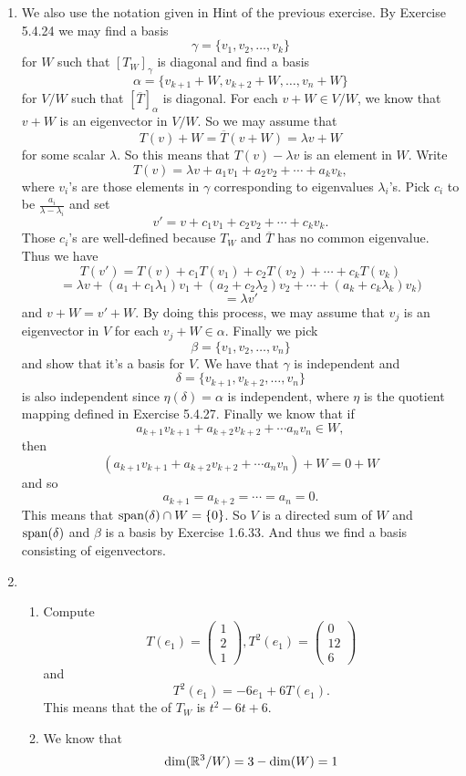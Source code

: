 \begin{enumerate}
\item We also use the notation given in Hint of the previous exercise. By Exercise 5.4.24 we may find a basis 
\[\gamma=\{v_1,v_2,\ldots ,v_k\}\]
for $W$ such that $[T_W]_{\gamma}$ is diagonal and find a basis 
\[\alpha=\{v_{k+1}+W,v_{k+2}+W,\ldots ,v_n+W\}\]
for $V/W$ such that $[\overline{T}]_{\alpha}$ is diagonal. For each $v+W\in V/W$, we know that $v+W$ is an eigenvector in $V/W$. So we may assume that 
\[T(v)+W=\overline{T}(v+W)=\lambda v+W\]
for some scalar $\lambda$.
So this means that $T(v)-\lambda v$ is an element in $W$. Write 
\[T(v)=\lambda v+a_1v_1+a_2v_2+\cdots +a_kv_k,\]
where $v_i$'s are those elements in $\gamma$ corresponding to eigenvalues $\lambda_i$'s.
Pick $c_i$ to be $\frac{a_i}{\lambda-\lambda_i}$ and set 
\[v'=v+c_1v_1+c_2v_2+\cdots +c_kv_k.\]
Those $c_i$'s are well-defined because $T_W$ and $\overline{T}$ has no common eigenvalue.
Thus we have 
\[T(v')=T(v)+c_1T(v_1)+c_2T(v_2)+\cdots +c_kT(v_k)\]
\[=\lambda v+(a_1+c_1\lambda_1)v_1+(a_2+c_2\lambda_2)v_2+\cdots +(a_k+c_k\lambda_k)v_k)\]
\[=\lambda v'\]
and $v+W=v'+W$.
By doing this process, we may assume that $v_j$ is an eigenvector in $V$ for each $v_j+W\in \alpha$. Finally we pick 
\[\beta=\{v_1,v_2,\ldots ,v_n\}\]
and show that it's a basis for $V$. We have that $\gamma $ is independent and 
\[\delta=\{v_{k+1},v_{k+2},\ldots ,v_n\}\]
is also independent since $\eta(\delta)=\alpha$ is independent, where $\eta$ is the quotient mapping defined in Exercise 5.4.27. Finally we know that if 
\[a_{k+1}v_{k+1}+a_{k+2}v_{k+2}+\cdots a_nv_n\in W,\]
then 
\[(a_{k+1}v_{k+1}+a_{k+2}v_{k+2}+\cdots a_nv_n)+W=0+W\]
and so 
\[a_{k+1}=a_{k+2}=\cdots =a_n=0.\]
This means that $\sp(\delta)\cap W=\{0\}$. So $V$ is a directed sum of $W$ and $\sp(\delta)$ and $\beta$ is a basis by Exercise 1.6.33. And thus we find a basis consisting of eigenvectors.
\item \begin{enumerate}
\item Compute 
\[T(e_1)=\begin{pmatrix}1\\2\\1\end{pmatrix},T^2(e_1)=\begin{pmatrix}0\\12\\6\end{pmatrix}\]
and 
\[T^2(e_1)=-6e_1+6T(e_1).\]
This means that the \charpoly{} of $T_W$ is $t^2-6t+6$.
\item We know that 
\[\dim(\R^3/W)=3-\dim(W)=1\]

\end{enumerate}
\end{enumerate}
